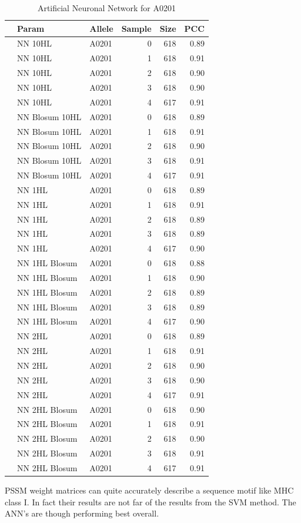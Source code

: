 \begin{table}[ht]
\begin{center}
\begin{tabular}{rllrrr}
  \hline
 & Param & Allele & Sample & Size & PCC \\ 
  \hline
 & NN 10HL & A0201 &   0 & 618 & 0.89 \\ 
   & NN 10HL & A0201 &   1 & 618 & 0.91 \\ 
   & NN 10HL & A0201 &   2 & 618 & 0.90 \\ 
   & NN 10HL & A0201 &   3 & 618 & 0.90 \\ 
   & NN 10HL & A0201 &   4 & 617 & 0.91 \\ 
   \hline
   & NN Blosum 10HL & A0201 &   0 & 618 & 0.89 \\ 
   & NN Blosum 10HL & A0201 &   1 & 618 & 0.91 \\ 
   & NN Blosum 10HL & A0201 &   2 & 618 & 0.90 \\ 
   & NN Blosum 10HL & A0201 &   3 & 618 & 0.91 \\ 
   & NN Blosum 10HL & A0201 &   4 & 617 & 0.91 \\ 
   \hline
   & NN 1HL & A0201 &   0 & 618 & 0.89 \\ 
   & NN 1HL & A0201 &   1 & 618 & 0.91 \\ 
   & NN 1HL & A0201 &   2 & 618 & 0.89 \\ 
   & NN 1HL & A0201 &   3 & 618 & 0.89 \\ 
   & NN 1HL & A0201 &   4 & 617 & 0.90 \\ 
   \hline
   & NN 1HL Blosum & A0201 &   0 & 618 & 0.88 \\ 
   & NN 1HL Blosum & A0201 &   1 & 618 & 0.90 \\ 
   & NN 1HL Blosum & A0201 &   2 & 618 & 0.89 \\ 
   & NN 1HL Blosum & A0201 &   3 & 618 & 0.89 \\ 
   & NN 1HL Blosum & A0201 &   4 & 617 & 0.90 \\ 
   \hline
   & NN 2HL & A0201 &   0 & 618 & 0.89 \\ 
   & NN 2HL & A0201 &   1 & 618 & 0.91 \\ 
   & NN 2HL & A0201 &   2 & 618 & 0.90 \\ 
   & NN 2HL & A0201 &   3 & 618 & 0.90 \\ 
   & NN 2HL & A0201 &   4 & 617 & 0.91 \\ 
   \hline
   & NN 2HL Blosum & A0201 &   0 & 618 & 0.90 \\ 
   & NN 2HL Blosum & A0201 &   1 & 618 & 0.91 \\ 
   & NN 2HL Blosum & A0201 &   2 & 618 & 0.90 \\ 
   & NN 2HL Blosum & A0201 &   3 & 618 & 0.91 \\ 
   & NN 2HL Blosum & A0201 &   4 & 617 & 0.91 \\ 
   \hline
\end{tabular}
\caption{Artificial Neuronal Network for A0201}\label{tab:nn1}
\end{center}
\end{table}

PSSM weight matrices can quite accurately describe a sequence motif like MHC class I. In fact their results are not far of the results from the SVM method.
The ANN's are though performing best overall.

